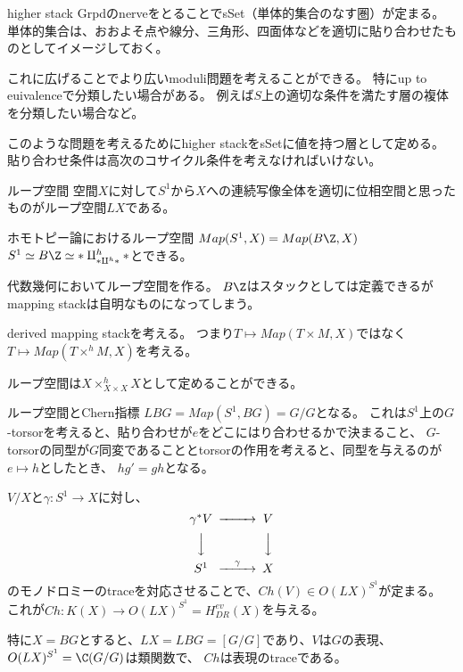 \documentclass[dvipdfmx]{beamer}
\begin{document}
\begin{frame}[fragile]{higher stack}
GrpdのnerveをとることでsSet（単体的集合のなす圏）が定まる。
単体的集合は、おおよそ点や線分、三角形、四面体などを適切に貼り合わせたものとしてイメージしておく。

これに広げることでより広いmoduli問題を考えることができる。
特にup to euivalenceで分類したい場合がある。
例えば$S$上の適切な条件を満たす層の複体を分類したい場合など。

このような問題を考えるためにhigher stackをsSetに値を持つ層として定める。
貼り合わせ条件は高次のコサイクル条件を考えなければいけない。


\end{frame}


\begin{frame}{ループ空間}
空間$X$に対して$S^1$から$X$への連続写像全体を適切に位相空間と思ったものがループ空間$LX$である。

ホモトピー論におけるループ空間
$Map(S^1,X)=Map(B\Z,X)$
$S^1\simeq B\Z\simeq \ast\amalg^h_{\ast\amalg^h\ast}\ast$とできる。

代数幾何においてループ空間を作る。
$B\Z$はスタックとしては定義できるがmapping stackは自明なものになってしまう。

derived mapping stackを考える。
つまり$T \mapsto Map(T\times M,X)$ではなく$T\mapsto Map(T\times^hM,X)$を考える。

ループ空間は$X \times^h_{X\times X}X$として定めることができる。
\end{frame}

\begin{frame}{ループ空間とChern指標}
$LBG=Map(S^1,BG)=G/G$となる。
これは$S^1$上の$G$-torsorを考えると、貼り合わせが$e$をどこにはり合わせるかで決まること、
$G$-torsorの同型が$G$同変であることとtorsorの作用を考えると、同型を与えるのが$e\mapsto h$としたとき、
$hg'=gh$となる。

$V/X$と$\gamma:S^1\to X$に対し、
\[
\begin{CD}
\gamma^*V@>>>V\\
@VVV@VVV\\
S^1@>\gamma>>X
\end{CD}
\]
のモノドロミーのtraceを対応させることで、$Ch(V)\in O(LX)^{S^1}$が定まる。
これが$Ch:K(X) \to O(LX)^{S^1}=H^{ev}_{DR}(X)$を与える。

特に$X=BG$とすると、$LX=LBG=[G/G]$であり、$V$は$G$の表現、$O(LX)^{S^1}=\C(G/G)$は類関数で、
$Ch$は表現のtraceである。
\end{frame}
\end{document}

